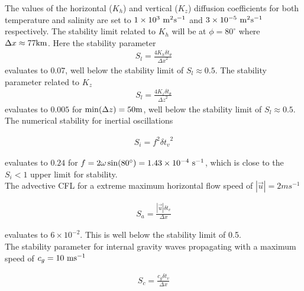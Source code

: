 {The values of the horizontal ($K_{h}$) and vertical ($K_{z}$) diffusion coefficients 
for both temperature and salinity are set to $1 \times 10^{3}~{\rm m}^{2}{\rm s}^{-1}$ 
and $3 \times 10^{-5}~{\rm m}^{2}{\rm s}^{-1}$ respectively. The stability limit 
related to $K_{h}$ will be at $\phi=80^{\circ}$ where $\Delta x \approx 77 {\rm km}$. 
Here the stability parameter 
\begin{eqnarray} 
\label{EQ:eg-hs-laplacian_stability_xtheta}
S_{l} = \frac{4 K_{h} \delta t_{\theta}}{{\Delta x}^2} 
\end{eqnarray}
evaluates to $0.07$, well below the stability limit of $S_{l} \approx 0.5$. The 
stability parameter related to $K_{z}$
\begin{eqnarray} 
\label{EQ:eg-hs-laplacian_stability_ztheta}
S_{l} = \frac{4 K_{z} \delta t_{\theta}}{{\Delta z}^2} 
\end{eqnarray}
evaluates to $0.005$ for $\min(\Delta z)=50{\rm m}$, well below the stability limit 
of $S_{l} \approx 0.5$.
\\

\noindent The numerical stability for inertial oscillations
\cite{adcroft:95} 

\begin{eqnarray}
\label{EQ:eg-hs-inertial_stability}
S_{i} = f^{2} {\delta t_v}^2
\end{eqnarray}

\noindent evaluates to $0.24$ for $f=2\omega\sin(80^{\circ})=1.43\times10^{-4}~{\rm s}^{-1}$, which is close to 
the $S_{i} < 1$ upper limit for stability.
\\

\noindent The advective CFL \cite{adcroft:95} for a extreme maximum 
horizontal flow
speed of $ | \vec{u} | = 2 ms^{-1}$

\begin{eqnarray}
\label{EQ:eg-hs-cfl_stability}
S_{a} = \frac{| \vec{u} | \delta t_{v}}{ \Delta x}
\end{eqnarray}

\noindent evaluates to $6 \times 10^{-2}$. This is well below the stability 
limit of 0.5.
\\

\noindent The stability parameter for internal gravity waves propagating
with a maximum speed of $c_{g}=10~{\rm ms}^{-1}$
\cite{adcroft:95}

\begin{eqnarray}
\label{EQ:eg-hs-gfl_stability}
S_{c} = \frac{c_{g} \delta t_{v}}{ \Delta x}
\end{eqnarray}

}
